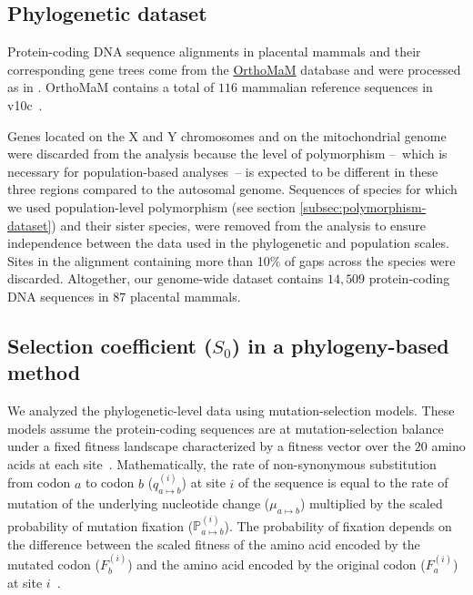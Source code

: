 \documentclass{article}
\newcommand{\proba}{\mathbb{P}}
\newcommand{\Sphy}{S_{0}}
\begin{document}
    \subsection{Phylogenetic dataset}\label{subsec:phylo-dataset}

    Protein-coding DNA sequence alignments in placental mammals and their corresponding gene trees come from the \href{https://www.orthomam.univ-montp2.fr}{OrthoMaM} database and were processed as in \textcite{latrille_genes_2023}.
    OrthoMaM contains a total of $116$ mammalian reference sequences in v10c~\cite{ranwez_orthomam_2007, douzery_orthomam_2014, scornavacca_orthomam_2019}.

    Genes located on the X and Y chromosomes and on the mitochondrial genome were discarded from the analysis because the level of polymorphism –~which is necessary for population-based analyses~– is expected to be different in these three regions compared to the autosomal genome.
    Sequences of species for which we used population-level polymorphism (see section \ref{subsec:polymorphism-dataset}) and their sister species, were removed from the analysis to ensure independence between the data used in the phylogenetic and population scales.
    Sites in the alignment containing more than 10\% of gaps across the species were discarded.
    Altogether, our genome-wide dataset contains $14,509$ protein-coding DNA sequences in $87$ placental mammals.

    \subsection{Selection coefficient ($\Sphy$) in a phylogeny-based method}
    \label{subsec:s-phylogeny-method}

    We analyzed the phylogenetic-level data using mutation-selection models.
    These models assume the protein-coding sequences are at mutation-selection balance under a fixed fitness landscape characterized by a fitness vector over the $20$ amino acids at each site~\cite{yang_mutationselection_2008, halpern_evolutionary_1998, rodrigue_mechanistic_2010}.
    Mathematically, the rate of non-synonymous substitution from codon $a$ to codon $b$ ($q_{a \mapsto b}^{(i)}$) at site $i$ of the sequence is equal to the rate of mutation of the underlying nucleotide change ($\mu_{a \mapsto b}$) multiplied by the scaled probability of mutation fixation ($\proba_{a \mapsto b}^{(i)}$).
    The probability of fixation depends on the difference between the scaled fitness of the amino acid encoded by the mutated codon ($F_b^{(i)}$) and the amino acid encoded by the original codon ($F_a^{(i)}$) at site $i$~\cite{wright_evolution_1931, fisher_genetical_1930}.
\end{document}
